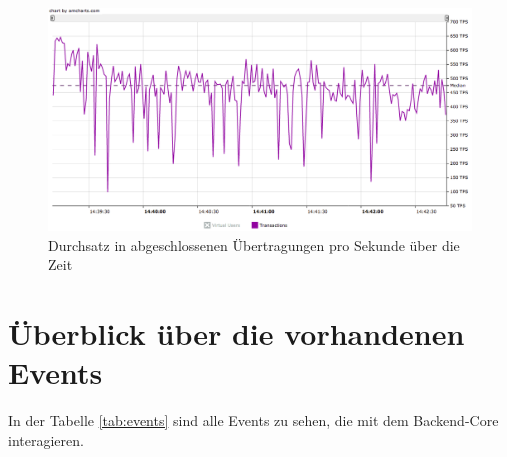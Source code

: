 \begin{figure}  
  \centering     
  \includegraphics[width=1.0\textwidth]{img/perf2.png}  
   \caption{Durchsatz in abgeschlossenen Übertragungen pro Sekunde über die Zeit}
  \label{fig:perf2} 
\end{figure}


\section{Überblick über die vorhandenen Events}
\label{event-overiview}
In der Tabelle \ref{tab:events} sind alle Events zu sehen, die mit dem \gls{Backend}-Core interagieren.

